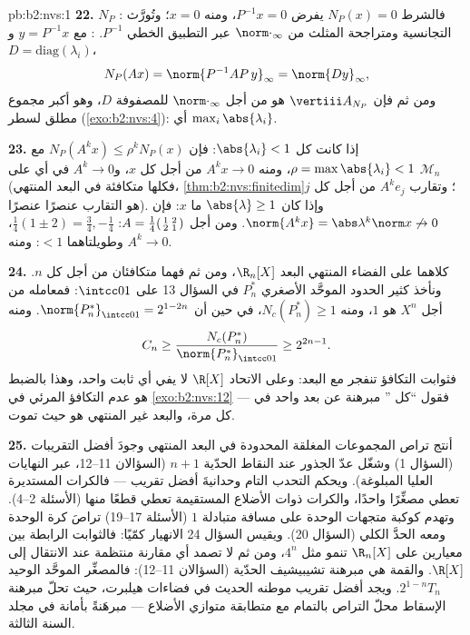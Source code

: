 \begin{solution}{pb:b2:nvs:1}
\textbf{22.} $N_P$ : فالشرط $N_P(x) = 0$ يفرض $P^{-1}x = 0$،
ومنه $x = 0$؛ وتُورَّث التجانسية ومتراجحة المثلث
من $\norm\cdot_\infty$ عبر التطبيق الخطي $P^{-1}$. : مع $y = P^{-1}x$ و$D = \mathrm{diag}(\lambda_i)$،
\[
N_P(Ax) = \norm{P^{-1}AP\,y}_\infty = \norm{Dy}_\infty,
\]
ومن ثم فإن $\vertiii A_{N_P}$ هو  من أجل $\norm\cdot_\infty$
للمصفوفة $D$، وهو أكبر مجموع مطلق لسطر
(\cref{exo:b2:nvs:4}): أي $\max_i\abs{\lambda_i}$.

\textbf{23.} إذا كانت كل $\abs{\lambda_i} < 1$: فإن $N_P(A^kx) \leq
\rho^kN_P(x)$ مع $\rho = \max\abs{\lambda_i} < 1$، ومنه $A^kx
\to 0$ من أجل كل $x$، و$A^k \to 0$ في أي  على
$\mathcal{M}_n$ (فكلها متكافئة في البعد المنتهي،
\cref{thm:b2:nvs:finitedim}؛ وتقارب $A^ke_j$ من أجل كل
$j$ هو التقارب عنصرًا عنصرًا). وإذا كان $\abs{\lambda} \geq 1$ ما
 $x$: فإن $\norm{A^kx} = \abs\lambda^k\norm x
\not\to 0$. ومن أجل $A = \frac14\begin{psmallmatrix}1 & 2\\ 2 &
1\end{psmallmatrix}$:  $\frac14(1 \pm 2) =
\frac34, -\frac14$، وطويلتاهما $< 1$: ومنه $A^k \to 0$.

\textbf{24.} كلاهما  على الفضاء المنتهي البعد
$\R_n[X]$، ومن ثم فهما متكافئان من أجل كل $n$. ونأخذ كثير الحدود
الموحَّد الأصغري $P^*_n$ في السؤال 13 على $\intcc01$: فمعامله من أجل
$X^n$ هو $1$، ومنه $N_c(P^*_n) \geq 1$، في حين أن
$\norm{P^*_n}_{\intcc01} = 2^{1-2n}$. ومنه
\[
C_n \geq \frac{N_c(P^*_n)}{\norm{P^*_n}_{\intcc01}}
\geq 2^{2n-1} .
\]
فثوابت التكافؤ تنفجر مع البعد: وعلى
الاتحاد $\R[X]$ لا يفي أي ثابت واحد، وهذا بالضبط هو
عدم التكافؤ المرئي في \cref{exo:b2:nvs:12} --- فقول ``كل '' مبرهنة عن بعد واحد في كل مرة،
والبعد غير المنتهي هو حيث تموت.

\textbf{25.} أنتج تراص المجموعات المغلقة المحدودة في البعد
المنتهي وجودَ أفضل التقريبات (السؤال
1) وشغّل عدّ الجذور عند النقاط الحدّية $n + 1$
(السؤالان 11--12، عبر النهايات العليا المبلوغة). ويحكم التحدب التام
وحدانيةَ أفضل تقريب --- فالكرات المستديرة تعطي مصغِّرًا
واحدًا، والكرات ذوات الأضلاع المستقيمة تعطي قطعًا منها (الأسئلة
2--4). وتهدم كوكبة متجهات الوحدة على مسافة متبادلة
$1$ (الأسئلة 17--19) تراصَ كرة الوحدة
ومعه الحدَّ الكلي (السؤال 20). ويقيس السؤال 24
الانهيار كمّيًا: فالثوابت الرابطة بين معيارين على
$\R_n[X]$ تنمو مثل $4^n$، ومن ثم لا تصمد أي مقارنة منتظمة
عند الانتقال إلى $\R[X]$. والقمة هي مبرهنة تشيبيشيف
الحدّية (السؤالان 11--12): فالمصغِّر الموحَّد الوحيد
$2^{1-n}T_n$. ويجد أفضل تقريب موطنه الحديث في
فضاءات هيلبرت، حيث تحلّ مبرهنة الإسقاط محلّ
التراص بالتمام مع متطابقة متوازي الأضلاع ---
مبرهَنةً بأمانة في مجلد السنة الثالثة.
\end{solution}

